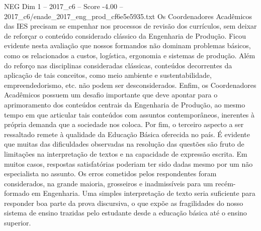 \begin{textsample}{NEG Dim 1 – 2017\_c6 – Score -4.00 – 2017\_c6/enade\_2017\_eng\_prod\_cf6e5e5935.txt}
Os Coordenadores Acadêmicos das IES precisam se empenhar nos processos de revisão dos currículos, sem deixar de reforçar o conteúdo considerado clássico da Engenharia de Produção.
Ficou evidente nesta avaliação que nossos formandos não dominam problemas básicos, como os relacionados a custos, logística, ergonomia e sistemas de produção.
Além do reforço nas disciplinas consideradas clássicas, conteúdos decorrentes da aplicação de tais conceitos, como meio ambiente e sustentabilidade, empreendedorismo, etc. não podem ser desconsiderados.
Enfim, os Coordenadores Acadêmicos possuem um desafio importante que deve apontar para o aprimoramento dos conteúdos centrais da Engenharia de Produção, ao mesmo tempo em que articular tais conteúdos com assuntos contemporâneos, inerentes à própria demanda que a sociedade nos coloca.
Por fim, o terceiro aspecto a ser ressaltado remete à qualidade da Educação Básica oferecida no país.
É evidente que muitas das dificuldades observadas na resolução das questões são fruto de limitações na interpretação de textos e na capacidade de expressão escrita.
Em muitos casos, respostas satisfatórias poderiam ter sido dadas mesmo por um não especialista no assunto.
Os erros cometidos pelos respondentes foram considerados, na grande maioria, grosseiros e inadmissíveis para um recém-formado em Engenharia.
Uma simples interpretação de texto seria suficiente para responder boa parte da prova discursiva, o que expõe as fragilidades do nosso sistema de ensino trazidas pelo estudante desde a educação básica até o ensino superior.

\end{textsample}

